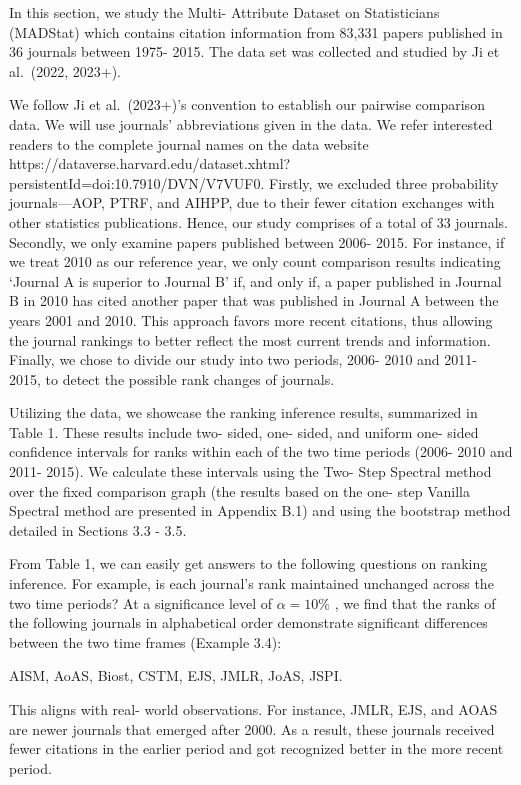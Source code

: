 In this section, we study the Multi- Attribute Dataset on Statisticians
(MADStat) which contains citation information from 83,331 papers
published in 36 journals between 1975- 2015. The data set was collected
and studied by Ji et al.~(2022, 2023+).

We follow Ji et al.~(2023+)'s convention to establish our pairwise
comparison data. We will use journals' abbreviations given in the data.
We refer interested readers to the complete journal names on the data
website
https://dataverse.harvard.edu/dataset.xhtml?persistentId=doi:10.7910/DVN/V7VUF0.
Firstly, we excluded three probability journals---AOP, PTRF, and AIHPP,
due to their fewer citation exchanges with other statistics
publications. Hence, our study comprises of a total of 33 journals.
Secondly, we only examine papers published between 2006- 2015. For
instance, if we treat 2010 as our reference year, we only count
comparison results indicating `Journal A is superior to Journal B' if,
and only if, a paper published in Journal B in 2010 has cited another
paper that was published in Journal A between the years 2001 and 2010.
This approach favors more recent citations, thus allowing the journal
rankings to better reflect the most current trends and information.
Finally, we chose to divide our study into two periods, 2006- 2010 and
2011- 2015, to detect the possible rank changes of journals.

Utilizing the data, we showcase the ranking inference results,
summarized in Table 1. These results include two- sided, one- sided, and
uniform one- sided confidence intervals for ranks within each of the two
time periods (2006- 2010 and 2011- 2015). We calculate these intervals
using the Two- Step Spectral method over the fixed comparison graph (the
results based on the one- step Vanilla Spectral method are presented in
Appendix B.1) and using the bootstrap method detailed in Sections 3.3 -
3.5.

From Table 1, we can easily get answers to the following questions on
ranking inference. For example, is each journal's rank maintained
unchanged across the two time periods? At a significance level of
\(\alpha = 10\%\) , we find that the ranks of the following journals in
alphabetical order demonstrate significant differences between the two
time frames (Example 3.4):

AISM, AoAS, Biost, CSTM, EJS, JMLR, JoAS, JSPI.

This aligns with real- world observations. For instance, JMLR, EJS, and
AOAS are newer journals that emerged after 2000. As a result, these
journals received fewer citations in the earlier period and got
recognized better in the more recent period.


